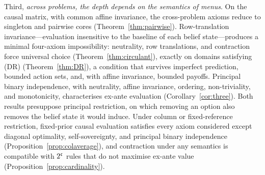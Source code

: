 Third, \emph{across problems, the depth depends on the semantics of menus}. On the causal matrix, with
common affine invariance, the cross-problem axioms reduce to singleton and pairwise cores
(Theorem~\ref{thm:pairwise}). Row-translation invariance---evaluation insensitive to the baseline
of each belief state---produces a minimal four-axiom impossibility: neutrality, row translations,
and contraction force universal choice (Theorem~\ref{thm:circulant}), exactly on domains satisfying
(DR) (Theorem~\ref{thm:DR}), a condition that survives imperfect prediction, bounded action sets,
and, with affine invariance, bounded payoffs. Principal binary independence, with neutrality, affine
invariance, ordering, non-triviality, and monotonicity, characterises ex-ante evaluation
(Corollary~\ref{cor:three}). Both results presuppose principal restriction, on which removing an
option also removes the belief state it would induce. Under column or fixed-reference restriction,
fixed-prior causal evaluation satisfies every axiom considered except diagonal optimality,
self-sovereignty, and principal binary independence (Proposition~\ref{prop:colaverage}), and contraction under any semantics is compatible with
$2^{\mathfrak{c}}$ rules that do not maximise ex-ante value (Proposition~\ref{prop:cardinality}).


